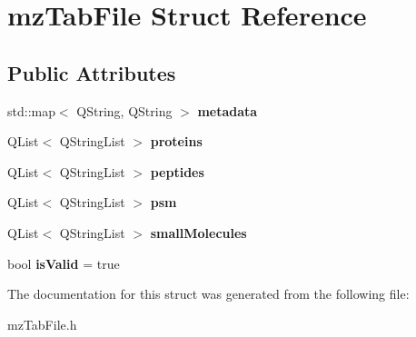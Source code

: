 \hypertarget{structmz_tab_file}{}\section{mz\+Tab\+File Struct Reference}
\label{structmz_tab_file}
\subsection*{Public Attributes}
\begin{DoxyCompactItemize}
\item 
\mbox{\label{structmz_tab_file_a6c20ef1e57959be37a12a6c77412ab50}} 
std\+::map$<$ Q\+String, Q\+String $>$ {\bfseries metadata}
\item 
\mbox{\label{structmz_tab_file_ad9b778603a2ea9c13dda56969c5a1c36}} 
Q\+List$<$ Q\+String\+List $>$ {\bfseries proteins}
\item 
\mbox{\label{structmz_tab_file_a165994178856f810865df12b475a55a6}} 
Q\+List$<$ Q\+String\+List $>$ {\bfseries peptides}
\item 
\mbox{\label{structmz_tab_file_a72f3db89bd7aea763d4684b0f12247b6}} 
Q\+List$<$ Q\+String\+List $>$ {\bfseries psm}
\item 
\mbox{\label{structmz_tab_file_a66c3e1a512b70b9a8669b227c04846b0}} 
Q\+List$<$ Q\+String\+List $>$ {\bfseries small\+Molecules}
\item 
\mbox{\label{structmz_tab_file_a5724e0be23c7762c23e4ffce0d297588}} 
bool {\bfseries is\+Valid} = true
\end{DoxyCompactItemize}


The documentation for this struct was generated from the following file\+:\begin{DoxyCompactItemize}
\item 
mz\+Tab\+File.\+h\end{DoxyCompactItemize}
